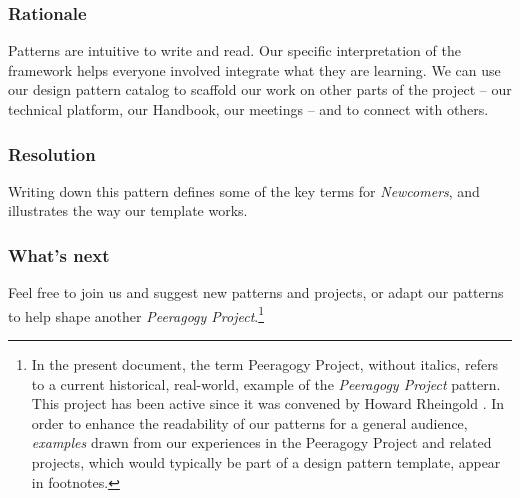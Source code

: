 \subsubsection*{Rationale}
Patterns are intuitive to write and read. Our specific interpretation of the framework helps everyone involved integrate what they are learning.  We can use our design pattern catalog to scaffold our work on other parts of the project -- our technical platform, our Handbook, our meetings -- and to connect with others.  

\subsubsection*{Resolution}  
Writing down this pattern defines some of the key terms for \emph{Newcomers}, and illustrates the way our template works. 

\subsubsection*{What's next} 
Feel free to join us and suggest new patterns and projects, or adapt our patterns to help shape another \emph{Peeragogy Project}.\footnote{In the present document, the term Peeragogy Project, without italics, refers to a current historical, real-world, example of the \emph{Peeragogy Project} pattern. This project has been active since it was convened by Howard Rheingold \cite{howard-rheingold-lecture}. In order to enhance the readability of our patterns for a general audience, \emph{examples} drawn from our experiences in the Peeragogy Project and related projects, which would typically be part of a design pattern template, appear in footnotes.}
